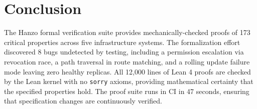 \section{Conclusion}

\label{sec:conclusion}

The Hanzo formal verification suite provides mechanically-checked proofs of
173 critical properties across five infrastructure systems. The formalization
effort discovered 8 bugs undetected by testing, including a permission
escalation via revocation race, a path traversal in route matching, and a
rolling update failure mode leaving zero healthy replicas. All 12,000 lines of
Lean 4 proofs are checked by the Lean kernel with no \texttt{sorry} axioms,
providing mathematical certainty that the specified properties hold. The proof
suite runs in CI in 47 seconds, ensuring that specification changes are
continuously verified.

